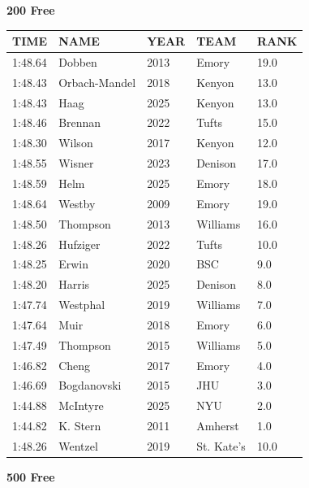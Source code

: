 \begin{table}[H]
\centering
\begin{minipage}[t]{0.48\textwidth}
\centering
\textbf{200 Free}\\[0.1cm]
\begin{tabular}{@{}p{1.8cm}p{2.8cm}p{1.2cm}p{1.4cm}p{0.8cm}@{}}
\hline
    \textbf{TIME} & \textbf{NAME} & \textbf{YEAR} & \textbf{TEAM} & \textbf{RANK} \\
\hline
    1:48.64 & Dobben & 2013 & Emory & 19.0 \\
    1:48.43 & Orbach-Mandel & 2018 & Kenyon & 13.0 \\
    1:48.43 & Haag & 2025 & Kenyon & 13.0 \\
    1:48.46 & Brennan & 2022 & Tufts & 15.0 \\
    1:48.30 & Wilson & 2017 & Kenyon & 12.0 \\
    1:48.55 & Wisner & 2023 & Denison & 17.0 \\
    1:48.59 & Helm & 2025 & Emory & 18.0 \\
    1:48.64 & Westby & 2009 & Emory & 19.0 \\
    1:48.50 & Thompson & 2013 & Williams & 16.0 \\
    1:48.26 & Hufziger & 2022 & Tufts & 10.0 \\
    1:48.25 & Erwin & 2020 & BSC & 9.0 \\
    1:48.20 & Harris & 2025 & Denison & 8.0 \\
    1:47.74 & Westphal & 2019 & Williams & 7.0 \\
    1:47.64 & Muir & 2018 & Emory & 6.0 \\
    1:47.49 & Thompson & 2015 & Williams & 5.0 \\
    1:46.82 & Cheng & 2017 & Emory & 4.0 \\
    1:46.69 & Bogdanovski & 2015 & JHU & 3.0 \\
    1:44.88 & McIntyre & 2025 & NYU & 2.0 \\
    1:44.82 & K. Stern & 2011 & Amherst & 1.0 \\
    1:48.26 & Wentzel & 2019 & St. Kate's & 10.0 \\
\hline
\end{tabular}
\end{minipage}\hfill
\begin{minipage}[t]{0.48\textwidth}
\centering
\textbf{500 Free}\\[0.1cm]
\begin{tabular}{@{}p{1.8cm}p{2.8cm}p{1.2cm}p{1.4cm}p{0.8cm}@{}}

\end{tabular}
\end{minipage}
\end{table}
